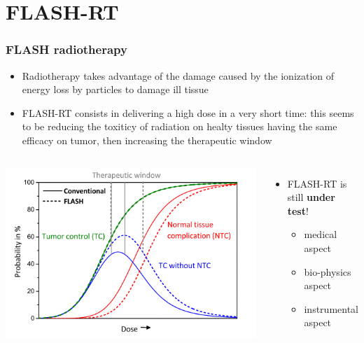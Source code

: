 \section{FLASH-RT}

    \begin{frame}
        \frametitle{FLASH radiotherapy}
        \begin{itemize}
            \item Radiotherapy takes advantage of the damage caused by the ionization of energy loss by particles to damage ill tissue
            \item FLASH-RT consists in delivering a high dose in a very short time: this seems to be reducing the toxiticy of radiation on healty tissues having the same efficacy on tumor, then increasing the therapeutic window
        \end{itemize}
        \medskip
        \begin{columns}
                \includegraphics[width=1.25\linewidth]{figures/pixel_detectors_usage/curve_flash.png}
            
            \begin{itemize}
                \item FLASH-RT is still \textbf{under test}!
                \begin{itemize}
                    \item medical aspect%
                    \item  bio-physics aspect%
                    \item  instrumental aspect%
                \end{itemize}
            \end{itemize}
        \end{columns}
    \end{frame} 


